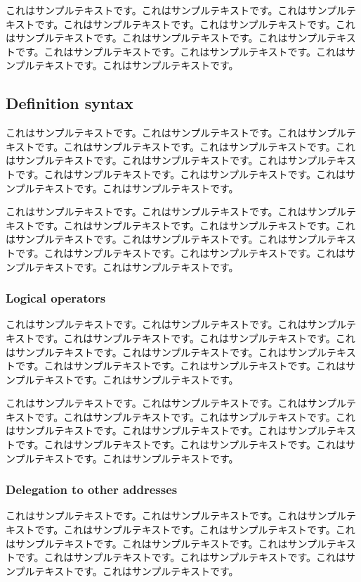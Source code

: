 \documentclass[a4paper, dvipdfmx]{jsarticle}
\begin{document}
これはサンプルテキストです。これはサンプルテキストです。これはサンプルテキストです。これはサンプルテキストです。これはサンプルテキストです。これはサンプルテキストです。これはサンプルテキストです。これはサンプルテキストです。これはサンプルテキストです。これはサンプルテキストです。これはサンプルテキストです。これはサンプルテキストです。

\subsection{Definition syntax}
これはサンプルテキストです。これはサンプルテキストです。これはサンプルテキストです。これはサンプルテキストです。これはサンプルテキストです。これはサンプルテキストです。これはサンプルテキストです。これはサンプルテキストです。これはサンプルテキストです。これはサンプルテキストです。これはサンプルテキストです。これはサンプルテキストです。

これはサンプルテキストです。これはサンプルテキストです。これはサンプルテキストです。これはサンプルテキストです。これはサンプルテキストです。これはサンプルテキストです。これはサンプルテキストです。これはサンプルテキストです。これはサンプルテキストです。これはサンプルテキストです。これはサンプルテキストです。これはサンプルテキストです。

\subsubsection{Logical operators}
これはサンプルテキストです。これはサンプルテキストです。これはサンプルテキストです。これはサンプルテキストです。これはサンプルテキストです。これはサンプルテキストです。これはサンプルテキストです。これはサンプルテキストです。これはサンプルテキストです。これはサンプルテキストです。これはサンプルテキストです。これはサンプルテキストです。

これはサンプルテキストです。これはサンプルテキストです。これはサンプルテキストです。これはサンプルテキストです。これはサンプルテキストです。これはサンプルテキストです。これはサンプルテキストです。これはサンプルテキストです。これはサンプルテキストです。これはサンプルテキストです。これはサンプルテキストです。これはサンプルテキストです。

\subsubsection{Delegation to other addresses}
これはサンプルテキストです。これはサンプルテキストです。これはサンプルテキストです。これはサンプルテキストです。これはサンプルテキストです。これはサンプルテキストです。これはサンプルテキストです。これはサンプルテキストです。これはサンプルテキストです。これはサンプルテキストです。これはサンプルテキストです。これはサンプルテキストです。
\end{document}
